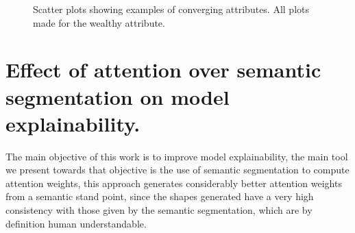 \begin{figure}[ht]
	\centering
	\hspace{0mm}
	\caption[SelfSegRank score vs segmentation scatter plots]{
		Scatter plots showing examples of converging attributes. All plots made
		for the wealthy attribute.
	}
	\label{fig:scatters}
\end{figure}

\section{Effect of attention over semantic segmentation on model explainability.}
The main objective of this work is to improve model explainability, the main tool we present
towards that objective is the use of semantic segmentation to compute attention weights, this
approach generates considerably better attention weights from a semantic stand point, since
the shapes generated have a very high consistency with those given by the semantic segmentation,
which are by definition human understandable.

